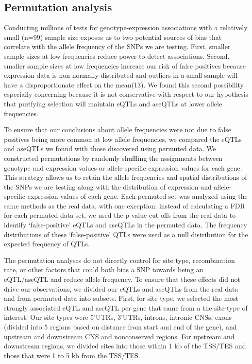 \subsection{Permutation analysis}
Conducting millions of tests for genotype-expression associations with a relatively small (n=99) sample size exposes us to two potential sources of bias that correlate with the allele frequency of the SNPs we are testing. First, smaller sample sizes at low frequencies reduce power to detect associations. Second, smaller sample sizes at low frequencies increase our risk of false positives because expression data is non-normally distributed and outliers in a small sample will have a disproportionate effect on the mean(13). We found this second possibility especially concerning because it is not conservative with respect to our hypothesis that purifying selection will maintain eQTLs and aseQTLs at lower allele frequencies. 

To ensure that our conclusions about allele frequencies were not due to false positives being more common at low allele frequencies, we compared the eQTLs and aseQTLs we found with those discovered using permuted data. We constructed permutations by randomly shuffling the assignments between genotype and expression values or allele-specific expression values for each gene. This strategy allows us to retain the allele frequencies and spatial distributions of the SNPs we are testing along with the distribution of expression and allele-specific expression values of each gene. Each permuted set was analyzed using the same methods as the real data, with one exception: instead of calculating a FDR for each permuted data set, we used the p-value cut offs from the real data to identify ‘false-positive’ eQTLs and aseQTLs in the permuted data. The frequency distributions of these ‘false-positive’ QTLs were used as a null distribution for the expected frequency of QTLs.

The permutation analyses do not directly control for site type, recombination rate, or other factors that could both bias a SNP towards being an eQTL/aseQTL and reduce allele frequency. To ensure that these effects did not drive our observations, we divided our eQTLs and aseQTLs from the real data and from permuted data into subsets. First, for site type, we selected the most strongly associated eQTL and aseQTL per gene that came from a the site-type of interest. Our site types were 5’UTRs, 3’UTRs, introns, intronic CNSs, exons (divided into 5 regions based on distance from start and end of the gene), and upstream and downstream CNS and nonconserved regions. For upstream and downstream regions, we divided sites into those within 1 kb of the TSS/TES and those that were 1 to 5 kb from the TSS/TES. 

